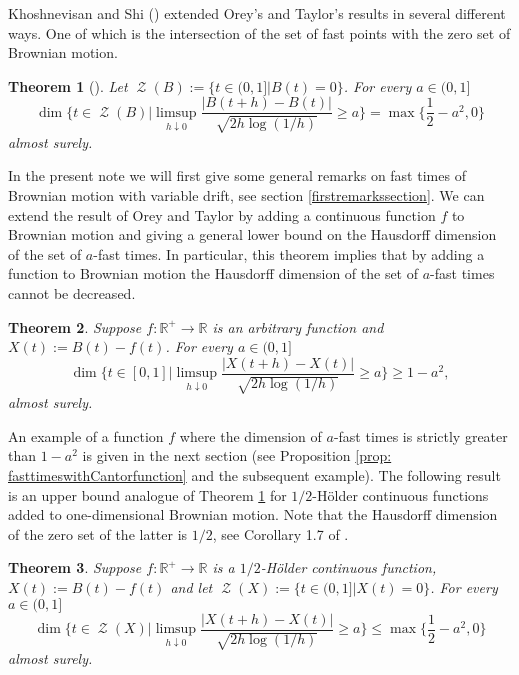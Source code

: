 \documentclass[11pt, reqno]{amsart}
\theoremstyle{plain}
\newtheorem{theorem}{Theorem}[section]
\theoremstyle{definition}
\theoremstyle{remark}
\begin{document}
Khoshnevisan and Shi (\cite{KS}) extended Orey's and Taylor's results \cite{OT74} in several different ways. One of which is the intersection of the set of fast points with the zero set of Brownian motion.

\begin{theorem}[\cite{KS}] \label{thm: KS2}
Let $\operatorname{\mathcal{Z}}(B):=\{ t\in(0,1] | B(t)= 0 \}$. For every $a\in(0,1]$
\[
\dim \Big\{ t\in \operatorname{\mathcal{Z}}(B) \Big| \limsup_{h \downarrow 0} \frac{|B(t+h)-B(t)|}{\sqrt{2h\log{(1/h)}}} \geq a  \Big\} = \max \Big\{\frac{1}{2}-a^2,0\Big\}
\]
almost surely.
\end{theorem}

In the present note we will first give some general remarks on fast times of Brownian motion with variable drift, see section \ref{firstremarkssection}.
We can extend the result of Orey and Taylor by adding a continuous function $f$ to Brownian motion and giving a general lower bound on the Hausdorff dimension of the set of $a$-fast times. 
In particular, this theorem implies that by adding a function to Brownian motion the Hausdorff dimension of the set of $a$-fast times cannot be decreased.

\begin{theorem} \label{thm: fast times lower bound general drift}
Suppose $f \colon \mathbb{R}^+ \to \mathbb{R}$ is an arbitrary function and $X(t):= B(t)-f(t)$. For every $a\in(0,1]$
\[
\dim \Big\{ t\in [0,1] \Big| \limsup_{h \downarrow 0} \frac{|X(t+h)-X(t)|}{\sqrt{2h\log{(1/h)}}} \geq a  \Big\} \geq 1-a^2,
\]
almost surely.
\end{theorem}
An example of a function $f$ where the dimension of $a$-fast times is strictly greater than $1-a^2$ is given in the next section (see Proposition \ref{prop: fasttimeswithCantorfunction} and the subsequent example).
The following result is an upper bound analogue of Theorem \ref{thm: KS2} for $1/2$-{H\"{o}lder } continuous functions added to one-dimensional Brownian motion. Note that the Hausdorff dimension of the zero set of the latter is $1/2$, see Corollary 1.7 of \cite{ABPR}.

\begin{theorem}\label{thm: intersection fast times and zeroset}
Suppose $f \colon \mathbb{R}^+ \to \mathbb{R}$ is a $1/2$-{H\"{o}lder } continuous function, $X(t):= B(t)-f(t)$ and let $\operatorname{\mathcal{Z}}(X):=\{ t\in(0,1] | X(t)= 0 \}$. For every $a\in(0,1]$
\[
\dim \Big\{ t\in\operatorname{\mathcal{Z}}(X) \Big| \limsup_{h \downarrow 0} \frac{|X(t+h)-X(t)|}{\sqrt{2h\log{(1/h)}}} \geq a  \Big\} \leq \max \Big\{\frac{1}{2}-a^2,0\Big\}
\]
almost surely.
\end{theorem}
\end{document}
